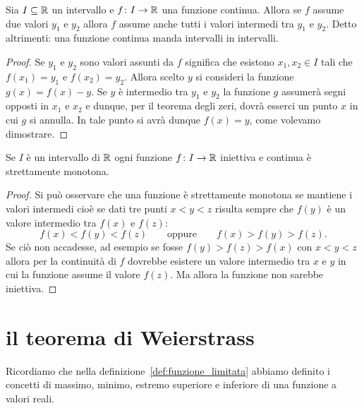 \begin{corollary}
\mymark{**}%
%
Sia $I\subseteq \mathbb R$ un intervallo e $f\colon I \to \mathbb R$ una
funzione continua.
Allora se $f$ assume due valori $y_1$ e $y_2$ allora $f$
assume anche tutti i valori intermedi tra $y_1$ e $y_2$.
Detto altrimenti: una funzione continua
manda intervalli in intervalli.
\end{corollary}
%
\begin{proof}
Se $y_1$ e $y_2$ sono valori assunti da $f$ significa
che esistono $x_1,x_2 \in I$ tali che $f(x_1)= y_1$ e $f(x_2)=y_2$.
Allora scelto $y$ si consideri la funzione $g(x) = f(x)-y$.
Se $y$ è intermedio tra $y_1$ e $y_2$ la funzione $g$ assumerà
segni opposti in $x_1$ e $x_2$ e dunque, per il teorema degli zeri,
dovrà esserci un punto $x$ in cui $g$ si annulla. In tale punto
si avrà dunque $f(x)=y$, come volevamo dimostrare.
\end{proof}

\begin{lemma}
\label{ex:inversa_monotona}%
Se $I$ è un intervallo di $\mathbb R$ ogni funzione $f\colon I \to \mathbb R$
iniettiva e continua è strettamente monotona.
\end{lemma}
%
\begin{proof}
Si può osservare che una funzione è strettamente monotona se mantiene i valori
intermedi cioè se dati tre punti
$x<y<z$ risulta sempre che $f(y)$ è un valore intermedio tra $f(x)$ e $f(z)$:
\[
  f(x)< f(y) <f(z) \qquad\text{oppure} \qquad f(x)> f(y) > f(z).
\]
Se ciò non accadesse, ad esempio se fosse $f(y)>f(z)>f(x)$ con $x<y<z$
allora per la continuità di $f$ dovrebbe esistere un valore intermedio
tra $x$ e $y$ in cui la funzione assume il valore $f(z)$. Ma allora la funzione
non sarebbe iniettiva.
\end{proof}

\section{il teorema di Weierstrass}

Ricordiamo che nella definizione~\ref{def:funzione_limitata}
abbiamo definito i concetti di massimo, minimo, estremo superiore
e inferiore di una funzione a valori reali.

